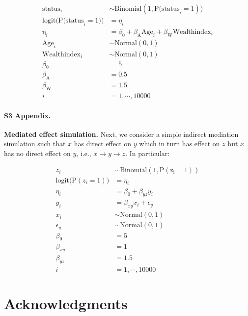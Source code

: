 \documentclass[10pt,letterpaper]{article}
\begin{document}
\begin{align}\label{sim:glm_two_pred}
\mathrm{status}_i &\sim \mathrm{Binomial}(1, \mathrm{P(status}_i = 1)) \nonumber\\
\mathrm{logit(P(status}_i = 1)) &= \eta_i \nonumber\\
\mathrm{\eta}_i &= \beta_0 + \beta_{\mathrm{A}}\mathrm{Age}_i + \beta_{\mathrm{W}}\mathrm{Wealthindex}_i \nonumber\\
\mathrm{Age}_i &\sim \mathrm{Normal}(0, 1) \nonumber\\
\mathrm{Wealthindex}_i &\sim \mathrm{Normal}(0, 1) \nonumber\\
\beta_0 &= 5 \nonumber\\
\beta_{\mathrm{A}} &= 0.5 \nonumber\\
\beta_{\mathrm{W}} &= 1.5 \nonumber\\
i &= 1,\cdots, 10000
\end{align}

\paragraph*{S3 Appendix.}
\label{S3_Appendix}
{\bf Mediated effect simulation.} Next, we consider a simple indirect mediation simulation such that $x$ has direct effect on $y$ which in turn has effect on $z$ but $x$ has no direct effect on $y$, i.e., $x \rightarrow y \rightarrow z$. In particular:

\begin{align}\label{sim:simple_mediate}
z_i &\sim \mathrm{Binomial(1, P(z_i = 1))} \nonumber\\
\mathrm{logit(P}(z_i = 1)) &= \eta_i \nonumber\\
\eta_i &= \beta_0 + \beta_{yz} y_i \nonumber\\
y_i &= \beta_{xy} x_i + \epsilon_y \nonumber\\
x_i &\sim \mathrm{Normal(0, 1)} \nonumber\\
\epsilon_y &\sim \mathrm{Normal(0, 1)} \nonumber\\
\beta_0 &= 5 \nonumber\\
\beta_{xy} &= 1 \nonumber\\
\beta_{yz} &= 1.5 \nonumber\\
i &= 1,\cdots, 10000
\end{align}


\section*{Acknowledgments}
\end{document}
